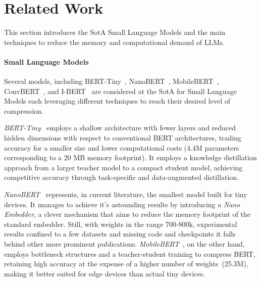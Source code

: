 \section{Related Work}
\label{sec:relatedwork}



This section introduces the SotA Small Language Models and the main techniques to reduce the memory and computational demand of LLMs.

\paragraph{Small Language Models} 
Several models, including BERT-Tiny~\cite{tinyBERT}, NanoBERT~\cite{NanoBERT}, MobileBERT~\cite{MobileBERT}, ConvBERT~\cite{ConvBERT}, and I-BERT~\cite{i-BERT} are considered at the SotA for Small Language Models each leveraging different techniques to reach their desired level of compression. 


\textit{BERT-Tiny}~\cite{tinyBERT} employs a shallow architecture with fewer layers and reduced hidden dimensions with respect to conventional BERT architectures, trading accuracy for a smaller size and lower computational costs (4.4M parameters corresponding to a 20 MB memory footprint). It employs a knowledge distillation approach from a larger teacher model to a compact student model, achieving competitive accuracy through task-specific and data-augmented distillation. 

\textit{NanoBERT}~\cite{NanoBERT} represents, in current literature, the smallest model built for tiny devices. It manages to achieve it's astounding results by introducing a \emph{Nano Embedder}, a clever mechanism that aims to reduce the memory footprint of the standard embedder. Still, with weights in the range 700-800k, experimental results confined to a few datasets and missing code and checkpoints it falls behind other more prominent publications. \textit{MobileBERT}~\cite{MobileBERT}, on the other hand, employs bottleneck structures and a teacher-student training to compress BERT, retaining high accuracy at the expense of a higher number of weights~(25.3M), making it better suited for edge devices than actual tiny devices.

